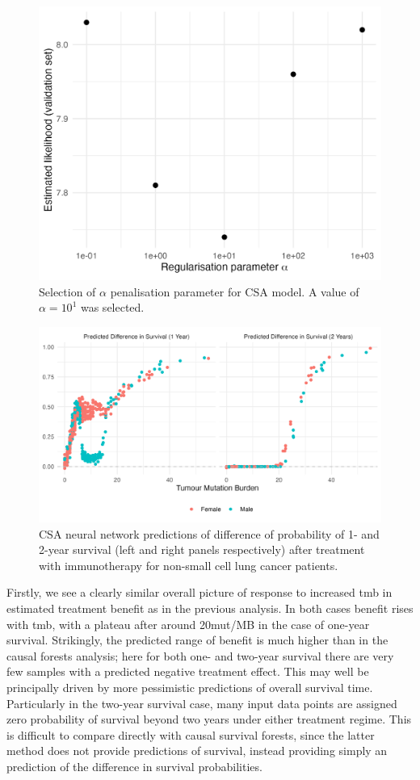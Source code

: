 \documentclass[../thesis.tex]{subfiles}
\begin{document}
\begin{figure}[!tpb] 
\centering
\includegraphics[width=.6\textwidth]{figures/chapter4/alpha_selection_fig.png} 

\caption{Selection of $\alpha$ penalisation parameter for CSA model. A value of $\alpha=10^1$ was selected. \label{fig:alpha_selection}}
\end{figure}

\begin{figure}[!tpb] 
\centering
\includegraphics[width=\textwidth]{figures/chapter4/train_samples_nn_predictions.png} 

\caption{CSA neural network predictions of difference of probability of 1- and 2-year survival (left and right panels respectively) after treatment with immunotherapy for non-small cell lung cancer patients. \label{fig:immuno_train_samples_nn_hte_predictions}}
\end{figure}

Firstly, we see a clearly similar overall picture of response to increased \gls{tmb} in estimated treatment benefit as in the previous analysis. In both cases benefit rises with \gls{tmb}, with a plateau after around 20mut/MB in the case of one-year survival. Strikingly, the predicted range of benefit is much higher than in the causal forests analysis; here for both one- and two-year survival there are very few samples with a predicted negative treatment effect. This may well be principally driven by more pessimistic predictions of overall survival time. Particularly in the two-year survival case, many input data points are assigned zero probability of survival beyond two years under either treatment regime. This is difficult to compare directly with causal survival forests, since the latter method does not provide predictions of survival, instead providing simply an prediction of the difference in survival probabilities.
\end{document}
